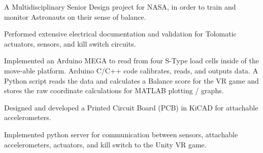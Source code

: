 \documentclass[a4paper]{comcv}
\begin{document}
\smallskip
    \begin{tightlist}
        \item A Multidisciplinary Senior Design project for NASA, in order to train and monitor Astronauts on their sense of balance.
        \item Performed extensive electrical documentation and validation for Tolomatic actuators, sensors, and kill switch circuits.
        \item Implemented an Arduino MEGA to read from four S-Type load cells inside of the move-able platform. Arduino C/C++ code calibrates, reads, and outputs data. A Python script reads the data and calculates a Balance score for the VR game and stores the raw coordinate calculations for MATLAB plotting / graphs. 
        \item Designed and developed a Printed Circuit Board (PCB) in KiCAD for attachable accelerometers.
        \item Implemented python server for communication between sensors, attachable accelerometers, actuators, and kill switch to the Unity VR game.

\end{tightlist}


\end{document}
